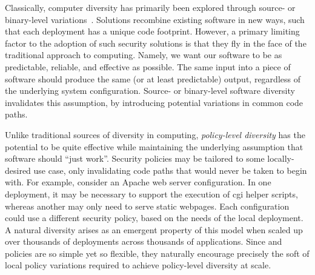 Classically, computer diversity has primarily been explored through source- or
binary-level variations~\cite{somayaji2007_immunology, persaud2016_frankenssl,
neti2012_software}. Solutions recombine existing software in new ways, such that each
deployment has a unique code footprint. However, a primary limiting factor to the adoption
of such security solutions is that they fly in the face of the traditional approach to
computing. Namely, we want our software to be as predictable, reliable, and effective as
possible. The same input into a piece of software should produce the same (or at least
predictable) output, regardless of the underlying system configuration. Source- or
binary-level software diversity invalidates this assumption, by introducing potential
variations in common code paths.

Unlike traditional sources of diversity in computing, \textit{policy-level diversity} has
the potential to be quite effective while maintaining the underlying assumption that
software should \enquote{just work}. Security policies may be tailored to some
locally-desired use case, only invalidating code paths that would never be taken to begin
with. For example, consider an Apache web server configuration. In one deployment, it may
be necessary to support the execution of \gls{cgi} helper scripts, whereas another may
only need to serve static webpages. Each configuration could use a different security
policy, based on the needs of the local deployment. A natural diversity arises as an
emergent property of this model when scaled up over thousands of deployments across
thousands of applications.  Since \bpfbox{} and \bpfcontain{} policies are so simple yet
so flexible, they naturally encourage precisely the soft of local policy variations
required to achieve policy-level diversity at scale.



